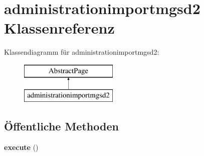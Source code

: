 \hypertarget{classadministrationimportmgsd2}{}\section{administrationimportmgsd2 Klassenreferenz}
\label{classadministrationimportmgsd2}
Klassendiagramm für administrationimportmgsd2\+:\begin{figure}[H]
\begin{center}
\leavevmode
\includegraphics[height=2.000000cm]{classadministrationimportmgsd2}
\end{center}
\end{figure}
\subsection*{Öffentliche Methoden}
\begin{DoxyCompactItemize}
\item 
\mbox{\label{classadministrationimportmgsd2_a4ec0c6062ef02fd72e32fd75d79de522}} 
{\bfseries execute} ()
\end{DoxyCompactItemize}
